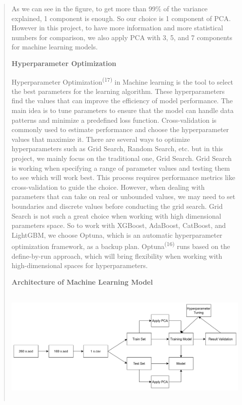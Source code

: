 \documentclass[
]{article}
\begin{document}
\begin{quote}
As we can see in the figure, to get more than 99\% of the variance
explained, 1 component is enough. So our choice is 1 component of PCA.
However in this project, to have more information and more statistical
numbers for comparison, we also apply PCA with 3, 5, and 7 components
for machine learning models.

\textbf{Hyperparameter Optimization}

Hyperparameter Optimization\textsuperscript{(17)} in Machine learning is
the tool to select the best parameters for the learning algorithm. These
hyperparameters find the values that can improve the efficiency of model
performance. The main idea is to tune parameters to ensure that the
model can handle data patterns and minimize a predefined loss function.
Cross-validation is commonly used to estimate performance and choose the
hyperparameter values that maximize it. There are several ways to
optimize hyperparameters such as Grid Search, Random Search, etc. but in
this project, we mainly focus on the traditional one, Grid Search. Grid
Search is working when specifying a range of parameter values and
testing them to see which will work best. This process requires
performance metrics like cross-validation to guide the choice. However,
when dealing with parameters that can take on real or unbounded values,
we may need to set boundaries and discrete values before conducting the
grid search. Grid Search is not such a great choice when working with
high dimensional parameters space. So to work with XGBoost, AdaBoost,
CatBoost, and LightGBM, we choose Optuna, which is an automatic
hyperparameter optimization framework, as a backup plan.
Optuna\textsuperscript{(16)} runs based on the define-by-run approach,
which will bring flexibility when working with high-dimensional spaces
for hyperparameters.

\textbf{Architecture of Machine Learning Model}

\includegraphics[width=5.75397in,height=2.24073in]{vertopal_f239f640fefe43bb8bc0698cafd57825/media/image6.png}
\end{quote}
\end{document}
